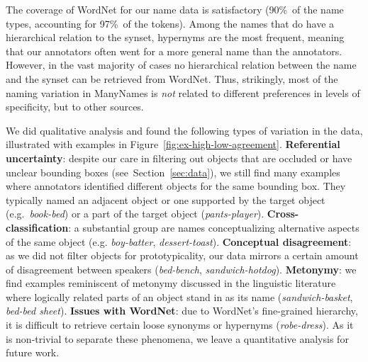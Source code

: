 The coverage of WordNet for our name data is satisfactory (90\%\ of the name types, accounting for 97\%\ of the tokens).
Among the names that do have a hierarchical relation to the synset, hypernyms are the most frequent, meaning that our annotators often went for a more general name than the \vg annotators.
However, in the vast majority of cases no hierarchical relation between the name and the synset can be retrieved from WordNet.
Thus, strikingly, most of the naming variation in ManyNames is \textit{not} related to different preferences in levels of specificity, but to other sources.

We did qualitative analysis and found the following types of variation in the data, illustrated with examples in Figure\ \ref{fig:ex-high-low-agreement}.
\textbf{Referential uncertainty}: despite our care in filtering out objects that are occluded or have unclear bounding boxes (see\ Section~\ref{sec:data}), we still find many examples where annotators identified different objects for the same bounding box. They typically named an adjacent object or one supported by the target object (e.g.\ \textit{book-bed}) or a part of the target object (\textit{pants-player}).
\textbf{Cross-classification}: a substantial group are names conceptualizing alternative aspects of the same object (e.g. \textit{boy-batter}, \textit{dessert-toast}).
\textbf{Conceptual disagreement}: as we did not filter objects for prototypicality, our data mirrors a certain amount of disagreement between speakers (\textit{bed-bench}, \textit{sandwich-hotdog}).
\textbf{Metonymy}: we find examples reminiscent of metonymy discussed in the linguistic literature \cite{pustejovsky1991generative} where logically related parts of an object stand in as its name (\textit{sandwich-basket}, \textit{bed-bed sheet}). 
\textbf{Issues with WordNet}: due to WordNet's fine-grained hierarchy, it is difficult to retrieve certain loose  synonyms or hypernyms (\textit{robe-dress}).
As it is non-trivial to separate these phenomena, we leave a quantitative analysis for future work.
